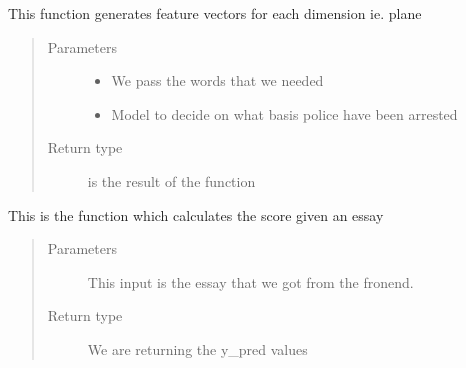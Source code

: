 \documentclass[letterpaper,10pt,english]{sphinxmanual}
\begin{document}
\begin{fulllineitems}
\label{\detokenize{prediction:prediction.makeFeatureVec}}
This function generates feature vectors for each dimension ie. plane
\begin{quote}\begin{description}
\item[{Parameters}] \leavevmode\begin{itemize}
\item {} 
 \textendash{} We pass the words that we needed

\item {} 
 \textendash{} Model to decide on what basis police have been arrested

\end{itemize}

\item[{Return type}] \leavevmode
{} is the result of the function

\end{description}\end{quote}

\end{fulllineitems}


\begin{fulllineitems}
\label{\detokenize{prediction:prediction.predict}}
This is the function which calculates the score given an essay
\begin{quote}\begin{description}
\item[{Parameters}] \leavevmode
{} \textendash{} This input is the essay that we got from the fronend.

\item[{Return type}] \leavevmode
We are returning the y\_pred values

\end{description}\end{quote}

\end{fulllineitems}
\end{document}
